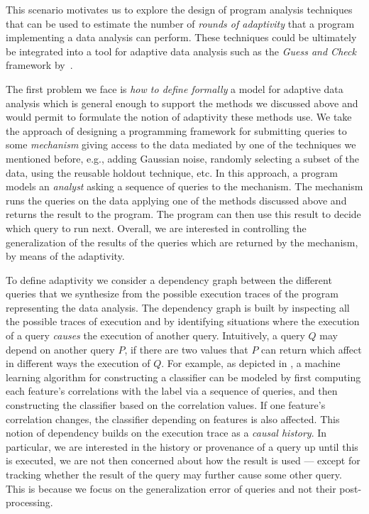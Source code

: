 This scenario motivates us to explore the design of program analysis techniques that can be used to estimate the number of \emph{rounds of adaptivity} that a program implementing a data analysis can perform. These techniques could be ultimately be integrated into a tool for adaptive data analysis such as the \emph{Guess and Check} framework by~\citet{RogersRSSTW20}. 
%

The first problem we face is \emph{how to define formally} a model for adaptive data analysis which is general enough to support the methods we discussed above and would permit to formulate the notion of adaptivity these methods use. We take the approach of designing a programming framework for submitting queries to some \emph{mechanism} giving access to the data mediated by one of the techniques we mentioned before, e.g., adding Gaussian noise, randomly selecting a subset of the data, using the reusable holdout technique, etc. In this approach, a program models an \emph{analyst} asking a sequence of queries to the mechanism. The mechanism runs the queries on the data applying one of the methods discussed above and returns the result to the program. The program can then use this result to decide which query to run next. Overall, we are interested in controlling the generalization of the results of the queries which are returned by the mechanism, by means of the adaptivity. 

To define adaptivity we consider a dependency graph between the different queries that we synthesize from the possible execution traces of the program representing the data analysis. The dependency graph is built by inspecting all the possible traces of execution and by identifying situations where the execution of a query \emph{causes} the execution of another query. Intuitively, a query $Q$ may depend on another query $P$, if there are two values that $P$ can return which affect in different ways the execution of $Q$. 
For example, as depicted in \cite{dwork2015reusable}, a machine learning algorithm for constructing a classifier can be modeled by first computing each feature's correlations with the label via a sequence of queries, and then constructing the classifier based on the correlation values. If one feature's correlation changes, the classifier depending on features is also affected.  
This notion of dependency builds on the execution trace as a \emph{causal history}. In particular, we are interested in the history or provenance of a query up until this is executed, we are not then concerned about how the result is used --- except for tracking whether the result of the query may further cause some other query. This is because we focus on the generalization error of queries and not their post-processing.  


